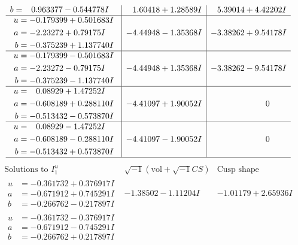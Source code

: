 \documentclass[1p]{elsarticle_modified}
\theoremstyle{definition}
\newcommand{\I}{\sqrt{-1}}
\begin{document}
$$\begin{array}{c|c|c}
\begin{aligned}
b &= \phantom{-}0.963377 - 0.544778 I\end{aligned}
 & \phantom{-}1.60418 + 1.28589 I & \phantom{-}5.39014 + 4.42202 I \\ \hline\begin{aligned}
u &= -0.179399 + 0.501683 I \\
a &= -2.23272 + 0.79175 I \\
b &= -0.375239 + 1.137740 I\end{aligned}
 & -4.44948 - 1.35368 I & -3.38262 + 9.54178 I \\ \hline\begin{aligned}
u &= -0.179399 - 0.501683 I \\
a &= -2.23272 - 0.79175 I \\
b &= -0.375239 - 1.137740 I\end{aligned}
 & -4.44948 + 1.35368 I & -3.38262 - 9.54178 I \\ \hline\begin{aligned}
u &= \phantom{-}0.08929 + 1.47252 I \\
a &= -0.608189 + 0.288110 I \\
b &= -0.513432 - 0.573870 I\end{aligned}
 & -4.41097 + 1.90052 I & \phantom{-0.000000 } 0 \\ \hline\begin{aligned}
u &= \phantom{-}0.08929 - 1.47252 I \\
a &= -0.608189 - 0.288110 I \\
b &= -0.513432 + 0.573870 I\end{aligned}
 & -4.41097 - 1.90052 I & \phantom{-0.000000 } 0\\
 \hline 
 \end{array}$$\newpage$$\begin{array}{c|c|c}  
\text{Solutions to }I^u_{1}& \I (\text{vol} + \sqrt{-1}CS) & \text{Cusp shape}\\
 \hline 
\begin{aligned}
u &= -0.361732 + 0.376917 I \\
a &= -0.671912 + 0.745291 I \\
b &= -0.266762 - 0.217897 I\end{aligned}
 & -1.38502 - 1.11204 I & -1.01179 + 2.65936 I \\ \hline\begin{aligned}
u &= -0.361732 - 0.376917 I \\
a &= -0.671912 - 0.745291 I \\
b &= -0.266762 + 0.217897 I\end{aligned}

\end{array}$$
\end{document}

